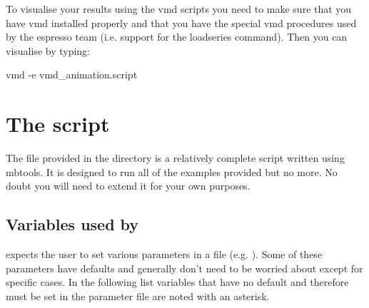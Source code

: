  To visualise your results using the vmd scripts you need to make sure that you have vmd installed properly and that you have the special vmd procedures used by the espresso team (i.e. support for the loadseries command). Then you can visualise by typing:

\begin{code}
  vmd -e vmd_animation.script
\end{code}  

\section{The  script}

 The  file provided in the  directory is a relatively complete script written using mbtools. It is designed to run all of the examples provided but no more. No doubt you will need to extend it for your own purposes.

\subsection{Variables used by }

 expects the user to set various parameters in a  file (e.g. ). Some of these parameters have defaults and generally don't need to be worried about except for specific cases. In the following list variables that have no default and therefore must be set in the parameter file are noted with an asterisk.

